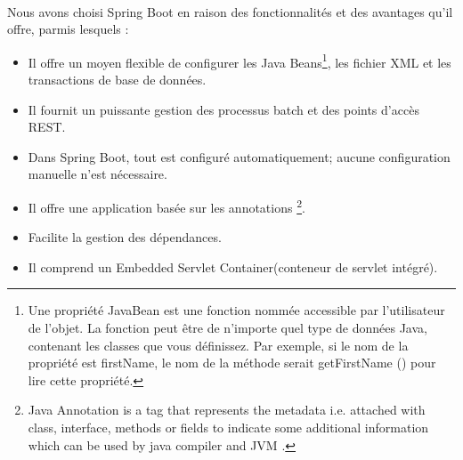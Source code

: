         \paragraph{}
        Nous avons choisi Spring Boot en raison des fonctionnalités et des avantages qu'il offre, parmis lesquels :
        \begin{itemize}
                \item Il offre un moyen flexible de configurer les Java Beans\footnote{
                        Une propriété JavaBean est une fonction nommée accessible par l'utilisateur de l'objet. 
                        La fonction peut être de n'importe quel type de données Java, contenant les classes que 
                        vous définissez. Par exemple, si le nom de la propriété est firstName, le nom de la méthode 
                        serait getFirstName () pour lire cette propriété.
                }, les
                 fichier XML et les transactions de base de données.
                \item Il fournit un puissante gestion des processus batch et des points d'accès REST.
                \item Dans Spring Boot, tout est configuré automatiquement; aucune configuration manuelle n'est nécessaire.
                \item Il offre une application basée sur les annotations \footnote{
                        Java Annotation is a tag that represents the metadata i.e. attached with class, interface, methods or fields to indicate 
                        some additional information which can be used by java compiler and JVM \cite{annotation}.
                }.
                \item Facilite la gestion des dépendances.
                \item Il comprend un Embedded Servlet Container(conteneur de servlet intégré).
        \end{itemize}
